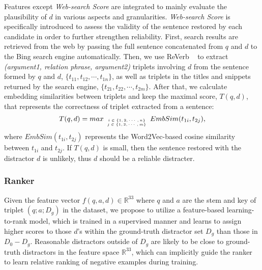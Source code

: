 Features except \textit{Web-search Score} are integrated to mainly evaluate the plausibility of $d$ in various aspects and granularities. \textit{Web-search Score} is specifically introduced to assess
the validity of the sentence restored by each candidate in order to further strengthen reliability.  
First, search results are retrieved from the web by passing the full sentence 
concatenated from $q$ and $d$ to the Bing search engine automatically. 
Then, we use ReVerb ~\cite{fader2011identifying} to 
extract \textit{(argument1, relation phrase, argument2)} triplets 
involving $d$ from the sentence formed by $q$ and 
$d$, $\{t_{11}, t_{12}, \cdots, t_{1n}\}$, 
as well as triplets in the titles and snippets returned by the search engine, 
$\{t_{21}, t_{22}, \cdots, t_{2m}\}$. 
After that, we calculate embedding similarities 
between triplets and keep the maximal score, 
$T(q,d)$, that represents the correctness of triplet extracted from a sentence:
\begin{equation*}
	T(q,d) = max_{\tiny \begin{array}{c}
	i\in \{1,2,\cdots,n\} \\ j \in \{1,2,\cdots,m\}
	\end{array}
	} EmbSim(t_{1i}, t_{2j}),
\end{equation*}
where $EmbSim(t_{1i}, t_{2j})$ represents the Word2Vec-based cosine similarity between $t_{1i}$ and $t_{2j}$.
If $T(q,d)$ is small, then the sentence restored with the distractor $d$ is unlikely, thus $d$ should be a reliable distracter. 

\subsubsection{Ranker}
\label{sec:AMMR}
Given the feature vector $f(q, a, d)\in \mathbb{R}^{33}$ where $q$ and 
$a$ are the stem and key of triplet $(q; a; D_g)$ in the dataset, 
we propose to utilize a feature-based learning-to-rank model, 
which is trained in a supervised manner and learns to assign higher
scores to those $d$'s within the ground-truth distractor set $D_g$ 
than those in $D_0-D_g$. Reasonable distractors outside of $D_g$ are 
likely to be close to ground-truth distractors in the feature space 
$\mathbb{R}^{33}$, which can implicitly guide the ranker to learn relative 
ranking of negative examples during training.


